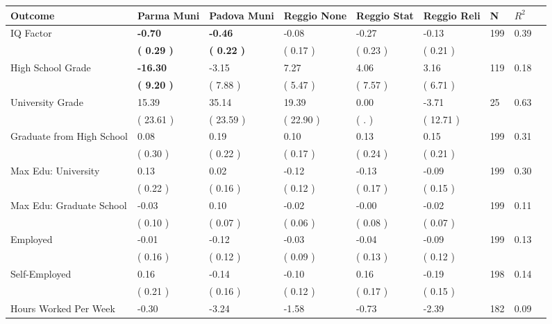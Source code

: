 \begin{tabular}{L{6.2cm} C{1.8cm} C{1.8cm} C{1.8cm} C{1.8cm} C{1.8cm} C{1.8cm} C{0.3cm} C{0.3cm}}
\toprule
 \textbf{Outcome} & \textbf{Parma Muni} & \textbf{Padova Muni} & \textbf{Reggio None} & \textbf{Reggio Stat} & \textbf{Reggio Reli} & \textbf{N} & \textbf{$ R^2$} \\
\midrule
IQ Factor & \textbf{    -0.70} & \textbf{    -0.46} &     -0.08 &     -0.27 &     -0.13  & 199 &       0.39 \\ 
 & \textbf{(     0.29 )} & \textbf{(     0.22 )} & (     0.17 ) & (     0.23 ) & (     0.21 )  & \\
High School Grade & \textbf{   -16.30} &     -3.15 &      7.27 &      4.06 &      3.16  & 119 &       0.18 \\ 
 & \textbf{(     9.20 )} & (     7.88 ) & (     5.47 ) & (     7.57 ) & (     6.71 )  & \\
University Grade &     15.39 &     35.14 &     19.39 &      0.00 &     -3.71  & 25 &       0.63 \\ 
 & (    23.61 ) & (    23.59 ) & (    22.90 ) & (        . ) & (    12.71 )  & \\
Graduate from High School &      0.08 &      0.19 &      0.10 &      0.13 &      0.15  & 199 &       0.31 \\ 
 & (     0.30 ) & (     0.22 ) & (     0.17 ) & (     0.24 ) & (     0.21 )  & \\
Max Edu: University &      0.13 &      0.02 &     -0.12 &     -0.13 &     -0.09  & 199 &       0.30 \\ 
 & (     0.22 ) & (     0.16 ) & (     0.12 ) & (     0.17 ) & (     0.15 )  & \\
Max Edu: Graduate School &     -0.03 &      0.10 &     -0.02 &     -0.00 &     -0.02  & 199 &       0.11 \\ 
 & (     0.10 ) & (     0.07 ) & (     0.06 ) & (     0.08 ) & (     0.07 )  & \\
Employed &     -0.01 &     -0.12 &     -0.03 &     -0.04 &     -0.09  & 199 &       0.13 \\ 
 & (     0.16 ) & (     0.12 ) & (     0.09 ) & (     0.13 ) & (     0.12 )  & \\
Self-Employed &      0.16 &     -0.14 &     -0.10 &      0.16 &     -0.19  & 198 &       0.14 \\ 
 & (     0.21 ) & (     0.16 ) & (     0.12 ) & (     0.17 ) & (     0.15 )  & \\
Hours Worked Per Week &     -0.30 &     -3.24 &     -1.58 &     -0.73 &     -2.39  & 182 &       0.09 \\ 

\end{tabular}
